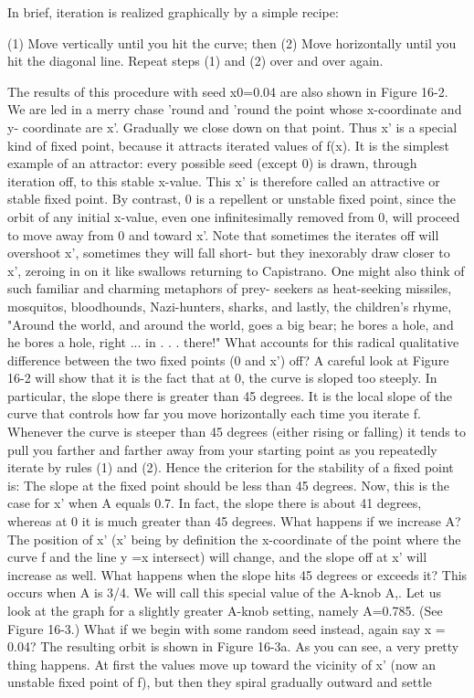 In brief, iteration is realized graphically by a simple recipe:

       (1) Move vertically until you hit the curve; then
       (2) Move horizontally until you hit the diagonal line.
       Repeat steps (1) and (2) over and over again.

         The results of this procedure with seed x0=0.04 are also shown in Figure 16-2.
We are led in a merry chase 'round and 'round the point whose x-coordinate and y-
coordinate are x'. Gradually we close down on that point. Thus x' is a special kind of
fixed point, because it attracts iterated values of f(x). It is the simplest example of an
attractor: every possible seed (except 0) is drawn, through iteration off, to this stable
x-value. This x' is therefore called an attractive or stable fixed point. By contrast, 0 is
a repellent or unstable fixed point, since the orbit of any initial x-value, even one
infinitesimally removed from 0, will proceed to move away from 0 and toward x'.
Note that sometimes the iterates off will overshoot x', sometimes they will fall short-
but they inexorably draw closer to x', zeroing in on it like swallows returning to
Capistrano. One might also think of such familiar and charming metaphors of prey-
seekers as heat-seeking missiles, mosquitos, bloodhounds, Nazi-hunters, sharks, and
lastly, the children's rhyme, "Around the world, and around the world, goes a big
bear; he bores a hole, and he bores a hole, right ... in . . . there!"
         What accounts for this radical qualitative difference between the two fixed
points (0 and x') off? A careful look at Figure 16-2 will show that it is the fact that at
0, the curve is sloped too steeply. In particular, the slope there is greater than 45
degrees. It is the local slope of the curve that controls how far you move horizontally
each time you iterate f. Whenever the curve is steeper than 45 degrees (either rising or
falling) it tends to pull you farther and farther away from your starting point as you
repeatedly iterate by rules (1) and (2). Hence the criterion for the stability of a fixed
point is: The slope at the fixed point should be less than 45 degrees. Now, this is the
case for x' when A equals 0.7. In fact, the slope there is about 41 degrees, whereas at
0 it is much greater than 45 degrees.
         What happens if we increase A? The position of x' (x' being by definition the
x-coordinate of the point where the curve f and the line y =x intersect) will change,
and the slope off at x' will increase as well. What happens when the slope hits 45
degrees or exceeds it? This occurs when A is 3/4. We will call this special value of the
A-knob A,. Let us look at the graph for a slightly greater A-knob setting, namely
A=0.785. (See Figure 16-3.)
         What if we begin with some random seed instead, again say x = 0.04? The
resulting orbit is shown in Figure 16-3a. As you can see, a very pretty thing happens.
At first the values move up toward the vicinity of x' (now an unstable fixed point of
f), but then they spiral gradually outward and settle




